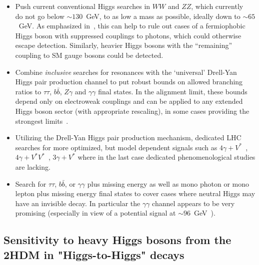 \documentclass[../report.tex]{subfiles}
\providecommand{\main}{..}
\begin{document}
\begin{itemize}
\item Push current conventional Higgs searches in $WW$ and $ZZ$, which
  currently~\cite{Khachatryan:2015cwa,Sirunyan:2018qlb} do not go below
  $\sim 130$~GeV, to as low a mass as possible, ideally down to $\sim
  65$~GeV. As emphasized in~\cite{Delgado:2016arn,Vega:2018ddp}, this
  can help to rule out cases of a fermiophobic Higgs boson with
  suppressed couplings to photons, which could otherwise escape
  detection. Similarly, heavier Higgs bosons with the ``remaining''
  coupling to SM gauge bosons could be detected.

\item Combine \emph{inclusive} searches for resonances with the
  `universal' Drell-Yan Higgs pair production channel to put robust
  bounds on allowed branching ratios to $\tau\tau$, $b\bar{b}$, $Z\gamma$ and
  $\gamma\gamma$ final states. In the alignment limit,
  these bounds depend only on electroweak couplings and can be applied
  to any extended Higgs boson sector (with appropriate rescaling), in
  some cases providing the strongest limits~\cite{Delgado:2016arn,Vega:2018ddp}.

\item Utilizing the Drell-Yan Higgs pair production mechanism, dedicated
  LHC searches for more optimized, but model dependent signals such as
  $4\gamma + V^\ast$~\cite{Akeroyd:2003bt,Aaltonen:2016fnw,Arhrib:2017wmo},
  $4\gamma + V^\ast V^\ast$~\cite{Akeroyd:2003bt}, $3\gamma +
  V^\ast$ where in the last case dedicated phenomenological studies are
  lacking. 

\item Search for $\tau\tau$, $b\bar{b}$, or $\gamma\gamma$ plus missing
  energy as well as mono photon or mono lepton plus missing energy final
  states to cover cases where neutral Higgs may have an invisible
  decay. In particular the $\gamma\gamma$ channel appears to be
  very promising (especially in view of a potential signal at 
  $\sim 96$~GeV~\cite{CMS-PAS-HIG-17-013}).
 
\end{itemize}

%


\subsection{Sensitivity to heavy Higgs bosons from the 2HDM in "Higgs-to-Higgs" decays}
\end{document}
